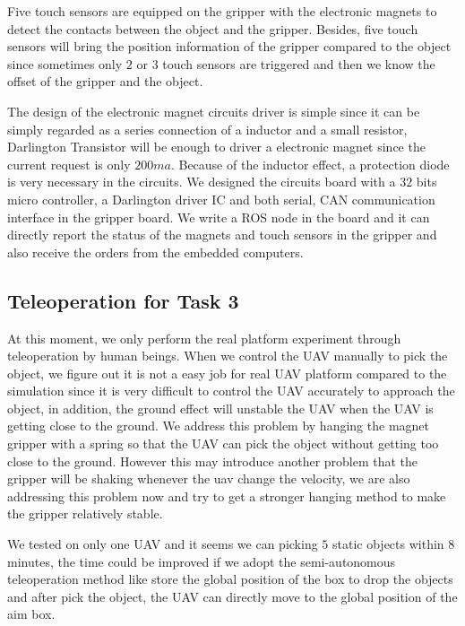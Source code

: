 \documentclass{standalone}
\begin{document}
Five touch sensors are equipped on the gripper with the electronic magnets to detect the contacts between the object and the gripper. Besides, five touch sensors will bring the position information of the gripper compared to the object since sometimes only $2$ or $3$ touch sensors are triggered and then we know the offset of the gripper and the object. 

The design of the electronic magnet circuits driver is simple since it can be simply regarded as a series connection of a inductor and a small resistor, Darlington Transistor will be enough to driver a electronic magnet since the current request is only $200ma$. Because of the inductor effect, a protection diode is very necessary in the circuits. We designed the circuits board with a $32$ bits micro controller, a Darlington driver IC and both serial, CAN communication interface in the gripper board. We write a ROS node in the board and it can directly report the status of the magnets and touch sensors in the gripper and also receive the orders from the embedded computers. 

\subsection{Teleoperation for Task 3}
At this moment, we only perform the real platform experiment through teleoperation by human beings. When we control the UAV manually to pick the object, we figure out it is not a easy job for real UAV platform compared to the simulation since it is very difficult to control the UAV accurately to approach the object, in addition, the ground effect will unstable the UAV when the UAV is getting close to the ground. We address this problem by hanging the magnet gripper with a spring so that the UAV can pick the object without getting too close to the ground. However this may introduce another problem that the gripper will be shaking whenever the uav change the velocity, we are also addressing this problem now and try to get a stronger hanging method to make the gripper relatively stable.

We tested on only one UAV and it seems we can picking $5$ static objects within $8$ minutes, the time could be improved if we adopt the semi-autonomous teleoperation method like store the global position of the box to drop the objects and after pick the object, the UAV can directly move to the global position of the aim box.
\end{document}
